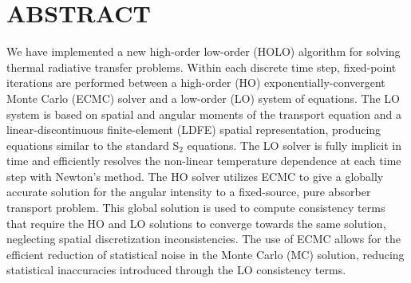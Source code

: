 %
%
%

\chapter*{ABSTRACT}

\pagestyle{plain} %
\setcounter{page}{2}

\indent 
We have implemented a new high-order low-order (HOLO) algorithm for solving
thermal radiative transfer problems.  Within each discrete time step, fixed-point iterations are performed between a
high-order (HO) exponentially-convergent Monte Carlo (ECMC) solver and a low-order (LO)
system of equations.  The LO system is based on spatial
and angular moments of the transport equation and a linear-discontinuous
finite-element (LDFE) spatial representation, producing equations similar to the standard
S$_2$ equations.  
The LO solver is fully implicit in time and efficiently resolves the non-linear
temperature dependence at each time step with Newton's method.   The HO solver
utilizes ECMC to give a globally accurate solution
for the angular intensity to a fixed-source, pure absorber transport problem.  This
global solution is used to compute consistency terms that require the HO and LO solutions
to converge towards the same solution, neglecting spatial discretization inconsistencies. The use of ECMC
allows for the efficient reduction of statistical noise in the Monte Carlo (MC) solution,
reducing statistical inaccuracies introduced through the LO consistency
terms. 
  
